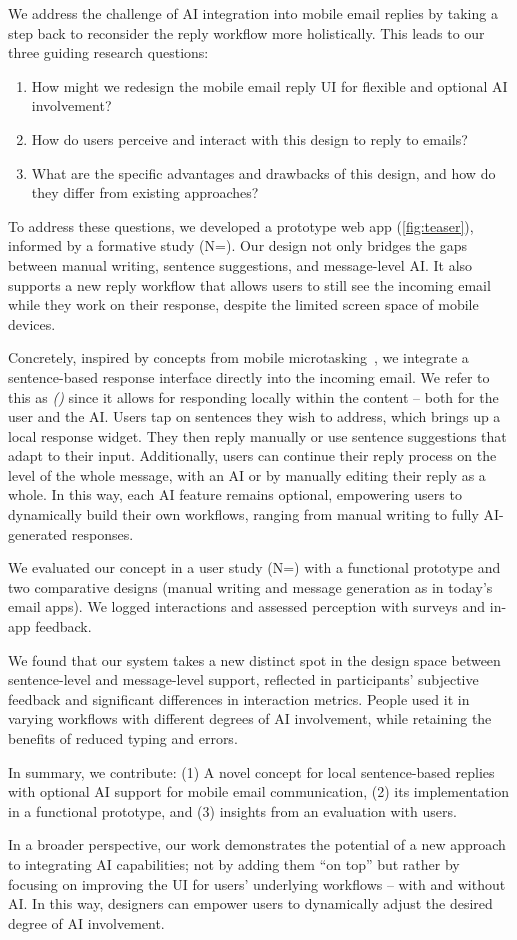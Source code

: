 We address the challenge of AI integration into mobile email replies by taking a step back to reconsider the reply workflow more holistically. This leads to our three guiding research questions:
\begin{enumerate}
    \item How might we redesign the mobile email reply UI for flexible and optional AI involvement?
    \item How do users perceive and interact with this design to reply to emails?
    \item What are the specific advantages and drawbacks of this design, and how do they differ from existing approaches?
\end{enumerate}
To address these questions, we developed a prototype web app (\cref{fig:teaser}), informed by a formative study (N=\studyOneN).
Our design not only bridges the gaps between manual writing, sentence suggestions, and message-level AI. It also supports a new reply workflow that allows users to still see the incoming email while they work on their response, despite the limited screen space of mobile devices. 

Concretely, inspired by concepts from mobile microtasking~\cite{august2020microwriting, iqbal2018playwrite}, we integrate a sentence-based response interface directly into the incoming email. We refer to this as \textit{\modeoursTXT{} (\modeours)} since it allows for responding locally within the content -- both for the user and the AI. Users tap on sentences they wish to address, which brings up a local response widget. They then reply manually or use sentence suggestions that adapt to their input.
Additionally, users can continue their reply process on the level of the whole message, with an AI \imppass{} or by manually editing their reply as a whole.
In this way, each AI feature remains optional, empowering users to dynamically build their own workflows, ranging from manual writing to fully AI-generated responses.

We evaluated our concept in a user study (N=\studyTwoN) with a functional prototype and two comparative designs (manual writing and message generation as in today's email apps). We logged interactions and assessed perception with surveys and in-app feedback.

We found that our system takes a new distinct spot in the design space between sentence-level and message-level support, reflected in participants' subjective feedback and significant differences in interaction metrics. %
People used it in varying workflows with different degrees of AI involvement, while retaining the benefits of reduced typing and errors. 

In summary, we contribute: (1) A novel concept for local sentence-based replies with optional AI support for mobile email communication, (2) its implementation in a functional prototype, and (3) insights from an evaluation with users.

In a broader perspective, our work demonstrates the potential of a new approach to integrating AI capabilities; not by adding them ``on top'' but rather by focusing on improving the UI for users' underlying workflows -- with and without AI. In this way, designers can empower users to dynamically adjust the desired degree of AI involvement. %
